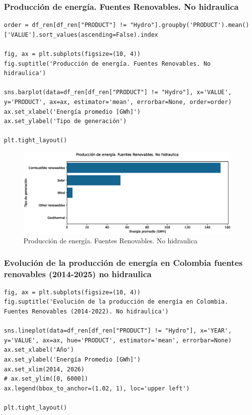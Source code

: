 \documentclass{article}
\begin{document}
\subsubsection{Producción de energía. Fuentes Renovables. No hidraulica}

\begin{verbatim}
order = df_ren[df_ren["PRODUCT"] != "Hydro"].groupby('PRODUCT').mean()['VALUE'].sort_values(ascending=False).index

fig, ax = plt.subplots(figsize=(10, 4))
fig.suptitle('Producción de energía. Fuentes Renovables. No hidraulica')

sns.barplot(data=df_ren[df_ren["PRODUCT"] != "Hydro"], x='VALUE', y='PRODUCT', ax=ax, estimator='mean', errorbar=None, order=order)
ax.set_xlabel('Energía promedio [GWh]')
ax.set_ylabel('Tipo de generación')

plt.tight_layout()	
\end{verbatim}

\begin{figure}[t]
	\centering
	\includegraphics[width=0.7\linewidth]{fig_14}
	\caption{Producción de energía. Fuentes Renovables. No hidraulica}
	\label{fig:fig14}
\end{figure}


\subsubsection{Evolución de la producción de energía en Colombia fuentes renovables (2014-2025) no hidraulica}

\begin{verbatim}
fig, ax = plt.subplots(figsize=(10, 4))
fig.suptitle('Evolución de la producción de energía en Colombia. Fuentes Renovables (2014-2022). No hidraulica')

sns.lineplot(data=df_ren[df_ren["PRODUCT"] != "Hydro"], x='YEAR', y='VALUE', ax=ax, hue='PRODUCT', estimator='mean', errorbar=None)
ax.set_xlabel('Año')
ax.set_ylabel('Energía Promedio [GWh]')
ax.set_xlim(2014, 2026)
# ax.set_ylim([0, 6000])
ax.legend(bbox_to_anchor=(1.02, 1), loc='upper left')

plt.tight_layout()
\end{verbatim}
\end{document}
